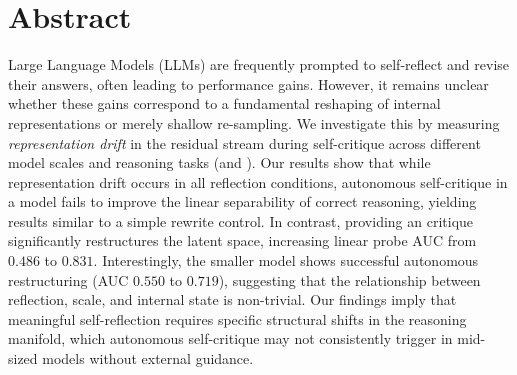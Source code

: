 \section*{Abstract}
Large Language Models (LLMs) are frequently prompted to self-reflect and revise their answers, often leading to performance gains. However, it remains unclear whether these gains correspond to a fundamental reshaping of internal representations or merely shallow re-sampling. We investigate this by measuring \textit{representation drift} in the residual stream during self-critique across different model scales and reasoning tasks (\gsm and \csqa). Our results show that while representation drift occurs in all reflection conditions, autonomous self-critique in a \qwenonefive model fails to improve the linear separability of correct reasoning, yielding results similar to a simple rewrite control. In contrast, providing an \external critique significantly restructures the latent space, increasing linear probe AUC from $0.486$ to $0.831$. Interestingly, the smaller \qwenzerofive model shows successful autonomous restructuring (AUC $0.550$ to $0.719$), suggesting that the relationship between reflection, scale, and internal state is non-trivial. Our findings imply that meaningful self-reflection requires specific structural shifts in the reasoning manifold, which autonomous self-critique may not consistently trigger in mid-sized models without external guidance.
